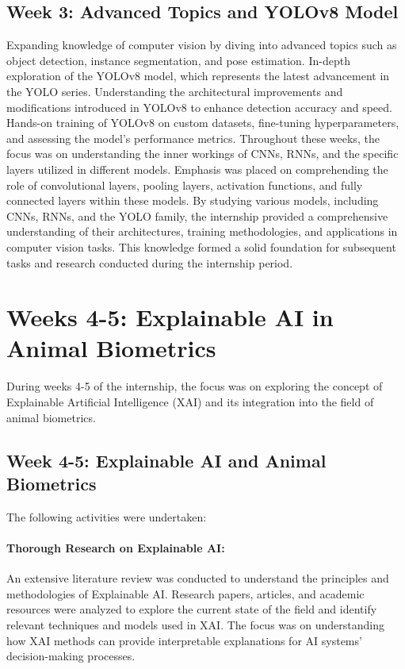 \documentclass{article}
\begin{document}
\subsection{Week 3: Advanced Topics and YOLOv8 Model}
Expanding knowledge of computer vision by diving into advanced topics such as object detection, instance segmentation, and pose estimation.
In-depth exploration of the YOLOv8 model, which represents the latest advancement in the YOLO series.
Understanding the architectural improvements and modifications introduced in YOLOv8 to enhance detection accuracy and speed.
Hands-on training of YOLOv8 on custom datasets, fine-tuning hyperparameters, and assessing the model's performance metrics.
Throughout these weeks, the focus was on understanding the inner workings of CNNs, RNNs, and the specific layers utilized in different models. Emphasis was placed on comprehending the role of convolutional layers, pooling layers, activation functions, and fully connected layers within these models.
By studying various models, including CNNs, RNNs, and the YOLO family, the internship provided a comprehensive understanding of their architectures, training methodologies, and applications in computer vision tasks. This knowledge formed a solid foundation for subsequent tasks and research conducted during the internship period.
\section{Weeks 4-5: Explainable AI in Animal Biometrics}
During weeks 4-5 of the internship, the focus was on exploring the concept of Explainable Artificial Intelligence (XAI) and its integration into the field of animal biometrics. 
\subsection{Week 4-5: Explainable AI and Animal Biometrics}
The following activities were undertaken:
\paragraph{Thorough Research on Explainable AI:} An extensive literature review was conducted to understand the principles and methodologies of Explainable AI.
Research papers, articles, and academic resources were analyzed to explore the current state of the field and identify relevant techniques and models used in XAI.
The focus was on understanding how XAI methods can provide interpretable explanations for AI systems' decision-making processes.
\end{document}
